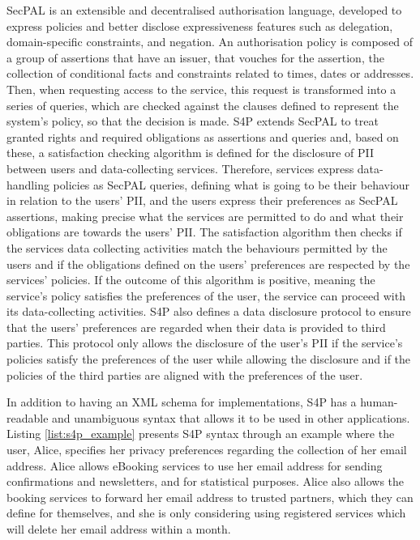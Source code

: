 SecPAL \citep{becker_design_2007} is an extensible and decentralised authorisation language, developed to express policies and better disclose expressiveness features such as delegation, domain-specific constraints, and negation.
An authorisation policy is composed of a group of assertions that have an issuer, that vouches for the assertion, the collection of conditional facts and constraints related to times, dates or addresses.
Then, when requesting access to the service, this request is transformed into a series of queries, which are checked against the clauses defined to represent the system's policy, so that the decision is made.
S4P extends SecPAL to treat granted rights and required obligations as assertions and queries and, based on these, a satisfaction checking algorithm is defined for the disclosure of PII between users and data-collecting services.
Therefore, services express data-handling policies as SecPAL queries, defining what is going to be their behaviour in relation to the users' PII, and the users express their preferences as SecPAL assertions, making precise what the services are permitted to do and what their obligations are towards the users' PII.
The satisfaction algorithm then checks if the services data collecting activities match the behaviours permitted by the users and if the obligations defined on the users' preferences are respected by the services' policies.
If the outcome of this algorithm is positive, meaning the service's policy satisfies the preferences of the user, the service can proceed with its data-collecting activities.
S4P also defines a data disclosure protocol to ensure that the users' preferences are regarded when their data is provided to third parties.
This protocol only allows the disclosure of the user's PII if the service's policies satisfy the preferences of the user while allowing the disclosure and if the policies of the third parties are aligned with the preferences of the user.

In addition to having an XML schema for implementations, S4P has a human-readable and unambiguous syntax that allows it to be used in other applications.
Listing \ref{list:s4p_example} presents S4P syntax through an example where the user, Alice, specifies her privacy preferences regarding the collection of her email address. Alice allows eBooking services to use her email address for sending confirmations and newsletters, and for statistical purposes. Alice also allows the booking services to forward her email address to trusted partners, which they can define for themselves, and she is only considering using registered services which will delete her email address within a month.

